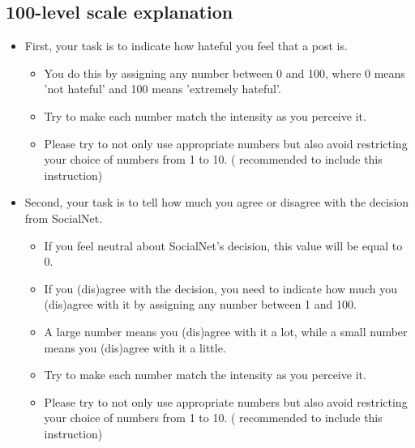 \documentclass[a4paper]{article}
\begin{document}
\subsection{100-level scale explanation}
\begin{itemize}
    \item First, your task is to indicate how hateful you feel that a post is.
          \begin{itemize}
              \item You do this by assigning any number between 0 and 100, where 0 means 'not hateful' and 100 means 'extremely hateful'.
              \item Try to make each number match the intensity as you perceive it.
              \item Please try to not only use appropriate numbers but also avoid restricting your choice of numbers from 1 to 10. (\cite{bard1996magnitude} recommended to include this instruction)
          \end{itemize}
    \item Second, your task is to tell how much you agree or disagree with the decision from SocialNet.
          \begin{itemize}
              \item If you feel neutral about SocialNet’s decision, this value will be equal to 0.
              \item If you (dis)agree with the decision, you need to indicate how much you (dis)agree with it by assigning any number between 1 and 100.
              \item A large number means you (dis)agree with it a lot, while a small number means you (dis)agree with it a little.
              \item Try to make each number match the intensity as you perceive it.
              \item Please try to not only use appropriate numbers but also avoid restricting your choice of numbers from 1 to 10. (\cite{bard1996magnitude} recommended to include this instruction)
          \end{itemize}
\end{itemize}
\end{document}
